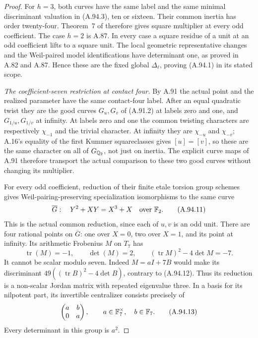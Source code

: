 \begin{proof}
For $h=3$, both curves have the same label and
the same minimal discriminant valuation in
(A.94.3), ten or sixteen.
Their common inertia has order twenty-four.
Theorem~7 of \cite{LegFreitasKraus2022}
therefore gives square multiplier at every
odd coefficient.  The case $h=2$ is A.87.
In every case a square residue of a unit at
an odd coefficient lifts to a square unit.
The local geometric representative changes
and the Weil-paired model identifications
have determinant one, as proved in A.82 and
A.87.  Hence these are the fixed global
$\Delta_\ell$, proving (A.94.1) in its stated scope.

\emph{The coefficient-seven restriction at contact four.}
By A.91 the actual point and the realized
parameter have the same contact-four label.
After an equal quadratic twist they are the
good curves $G_u,G_v$ of (A.91.2) at labels
zero and one, and $G_{1/u},G_{1/v}$ at infinity.
At labels zero and one the common twisting
characters are respectively $\chi_{-1}$ and
the trivial character.
At infinity they are $\chi_{-u}$ and
$\chi_{-v}$; A.16's equality of the first
Kummer squareclasses gives $[u]=[v]$, so
these are the same character on all of
$G_{\mathbb Q_2}$, not just on inertia.
The explicit curve maps of A.91 therefore
transport the actual comparison to these
two good curves without changing its
multiplier.

For every odd coefficient, reduction of their
finite etale torsion group schemes gives
Weil-pairing-preserving specialization
isomorphisms to the same curve
\[
                    \overline G:\quad
                    Y^2+XY=X^3+X\quad\text{over }\mathbb F_2.
\tag{A.94.11}
\]
This is the actual common reduction, since
each of $u,v$ is an odd unit.
There are four rational points on
$\overline G$: one over $X=0$, two over
$X=1$, and its point at infinity.
Its arithmetic Frobenius $M$ on $T_7$ has
\[
          \operatorname{tr}(M)=-1,\qquad
          \det(M)=2,\qquad
          (\operatorname{tr}M)^2-4\det M=-7.
\tag{A.94.12}
\]
It cannot be scalar modulo seven.
Indeed $M=aI+7B$ would make its discriminant
$49((\operatorname{tr}B)^2-4\det B)$,
contrary to (A.94.12).
Thus its reduction is a non-scalar Jordan
matrix with repeated eigenvalue three.
In a basis for its nilpotent part, its
invertible centralizer consists precisely of
\[
                    \begin{pmatrix}a&b\\0&a\end{pmatrix},
                         \qquad a\in\mathbb F_7^\times,
                                      \quad b\in\mathbb F_7.
\tag{A.94.13}
\]
Every determinant in this group is $a^2$.


\end{proof}
